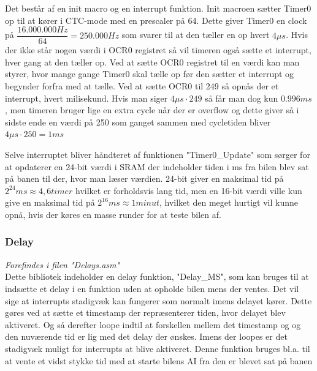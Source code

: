 Det består af en init macro og en interrupt funktion. Init macroen sætter Timer0 op til at kører i CTC-mode med en prescaler på 64. Dette giver Timer0 en clock på $\dfrac{16.000.000Hz}{64} = 250.000Hz$ som svarer til at den tæller en op hvert $4\mu s$. Hvis der ikke står nogen værdi i OCR0 registret så vil timeren også sætte et interrupt, hver gang at den tæller op. Ved at sætte OCR0 registret til en værdi kan man styrer, hvor mange gange Timer0 skal tælle op før den sætter et interrupt og begynder forfra med at tælle. Ved at sætte OCR0 til 249 så opnås der et interrupt, hvert milisekund. Hvis man siger $4\mu s  \cdot 249$ så får man dog kun $0.996 ms$, men timeren bruger lige en extra cycle når der er overflow og dette giver så i sidste ende en værdi på 250 som ganget sammen med cycletiden bliver $4\mu s  \cdot 250 = 1ms$ \par
Selve interruptet bliver håndteret af funktionen "Timer0\_Update" som sørger for at opdaterer en 24-bit værdi i SRAM der indeholder tiden i ms fra bilen blev sat på banen til der, hvor man læser værdien. 24-bit giver en maksimal tid på $2^{24} ms \approx 4,6 timer$ hvilket er forholdsvis lang tid, men en 16-bit værdi ville kun give en maksimal tid på $2^{16}ms \approx 1 minut$, hvilket den meget hurtigt vil kunne opnå, hvis der køres en masse runder for at teste bilen af.

\subsubsection{Delay}
\textit{Forefindes i filen "Delays.asm"}\\
Dette bibliotek indeholder en delay funktion, "Delay\_MS", som kan bruges til at indsætte et delay i en funktion uden at opholde bilen mens der ventes. Det vil sige at interrupts stadigvæk kan fungerer som normalt imens delayet kører. Dette gøres ved at sætte et timestamp der repræsenterer tiden, hvor delayet blev aktiveret. Og så derefter loope indtil at forskellen mellem det timestamp og og den nuværende tid er lig med det delay der ønskes. Imens der loopes er det stadigvæk muligt for interrupts at blive aktiveret. Denne funktion bruges bl.a. til at vente et vidst stykke tid med at starte bilens AI fra den er blevet sat på banen

